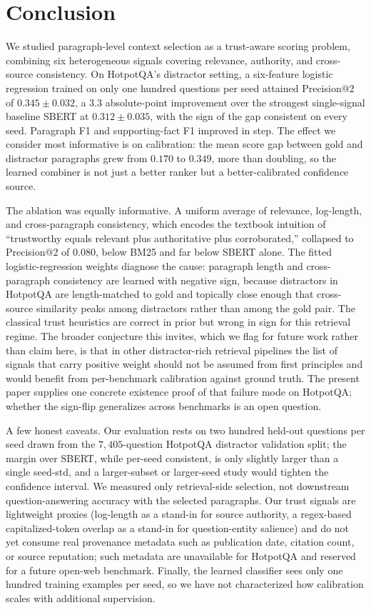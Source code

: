 \section{Conclusion}
\label{sec:conclusion}

We studied paragraph-level context selection as a trust-aware scoring
problem, combining six heterogeneous signals covering relevance,
authority, and cross-source consistency. On HotpotQA's distractor
setting, a six-feature logistic regression trained on only one hundred
questions per seed attained Precision@2 of $0.345 \pm 0.032$, a 3.3
absolute-point improvement over the strongest single-signal baseline
SBERT at $0.312 \pm 0.035$, with the sign of the gap consistent on
every seed. Paragraph F1 and supporting-fact F1 improved in step. The
effect we consider most informative is on calibration: the mean score
gap between gold and distractor paragraphs grew from $0.170$ to
$0.349$, more than doubling, so the learned combiner is not just a
better ranker but a better-calibrated confidence source.

The ablation was equally informative. A uniform average of relevance,
log-length, and cross-paragraph consistency, which encodes the
textbook intuition of ``trustworthy equals relevant plus authoritative
plus corroborated,'' collapsed to Precision@2 of $0.080$, below BM25
and far below SBERT alone. The fitted logistic-regression weights
diagnose the cause: paragraph length and cross-paragraph consistency
are learned with negative sign, because distractors in HotpotQA are
length-matched to gold and topically close enough that cross-source
similarity peaks among distractors rather than among the gold pair.
The classical trust heuristics are correct in prior but wrong in sign
for this retrieval regime. The broader conjecture this invites, which we flag for
future work rather than claim here, is that in other distractor-rich
retrieval pipelines the list of signals that carry positive weight
should not be assumed from first principles and would benefit from
per-benchmark calibration against ground truth. The present paper
supplies one concrete existence proof of that failure mode on
HotpotQA; whether the sign-flip generalizes across benchmarks is an
open question.

A few honest caveats. Our evaluation rests on two hundred held-out
questions per seed drawn from the $7{,}405$-question HotpotQA
distractor validation split; the margin over SBERT, while per-seed
consistent, is only slightly larger than a single seed-std, and a
larger-subset or larger-seed study would tighten the confidence
interval. We measured only retrieval-side selection, not downstream
question-answering accuracy with the selected paragraphs. Our trust
signals are lightweight proxies (log-length as a stand-in for source
authority, a regex-based capitalized-token overlap as a stand-in for
question-entity salience) and do not yet consume real provenance
metadata such as publication date, citation count, or source
reputation; such metadata are unavailable for HotpotQA and reserved
for a future open-web benchmark. Finally, the learned classifier
sees only one hundred training examples per seed, so we have not
characterized how calibration scales with additional supervision.

